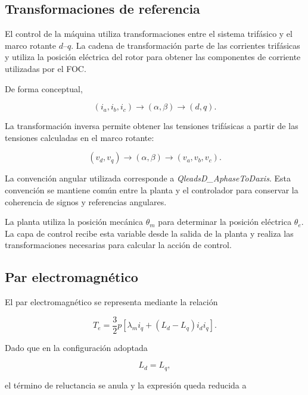 \subsection{Transformaciones de referencia}

El control de la máquina utiliza transformaciones entre el sistema trifásico y el marco rotante $d$--$q$. La cadena de transformación parte de las corrientes trifásicas y utiliza la posición eléctrica del rotor para obtener las componentes de corriente utilizadas por el FOC.

De forma conceptual,

\begin{equation}
(i_a,i_b,i_c)
\rightarrow
(\alpha,\beta)
\rightarrow
(d,q).
\end{equation}

La transformación inversa permite obtener las tensiones trifásicas a partir de las tensiones calculadas en el marco rotante:

\begin{equation}
(v_d,v_q)
\rightarrow
(\alpha,\beta)
\rightarrow
(v_a,v_b,v_c).
\end{equation}

La convención angular utilizada corresponde a \textit{QleadsD\_AphaseToDaxis}. Esta convención se mantiene común entre la planta y el controlador para conservar la coherencia de signos y referencias angulares.

La planta utiliza la posición mecánica $\theta_m$ para determinar la posición eléctrica $\theta_e$. La capa de control recibe esta variable desde la salida de la planta y realiza las transformaciones necesarias para calcular la acción de control.

\subsection{Par electromagnético}

El par electromagnético se representa mediante la relación

\begin{equation}
T_e=
\frac{3}{2}p
\left[
\lambda_m i_q+
(L_d-L_q)i_d i_q
\right].
\end{equation}

Dado que en la configuración adoptada

\begin{equation}
L_d=L_q,
\end{equation}

el término de reluctancia se anula y la expresión queda reducida a

